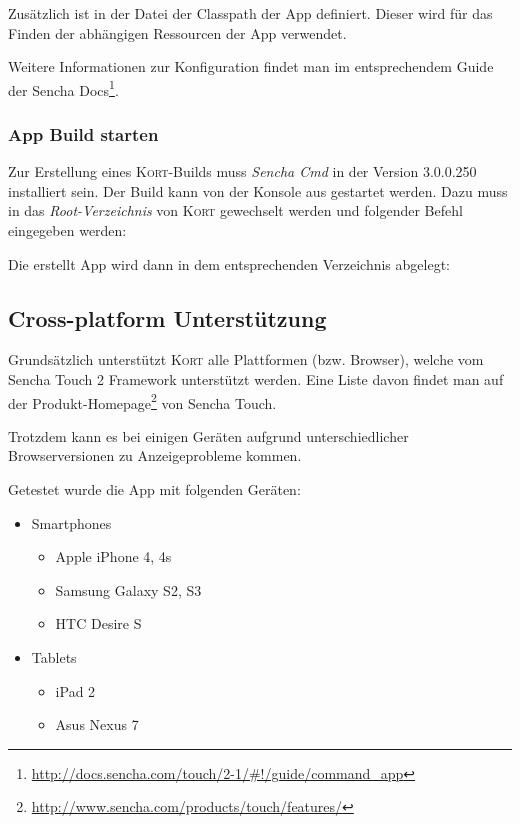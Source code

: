 Zusätzlich ist in der Datei  der Classpath der App definiert.
Dieser wird für das Finden der abhängigen Ressourcen der App verwendet.

Weitere Informationen zur Konfiguration findet man im entsprechendem Guide der Sencha Docs\footnote{\url{http://docs.sencha.com/touch/2-1/\#!/guide/command\_app}}.

\subsubsection{App Build starten}
Zur Erstellung eines \textsc{Kort}-Builds muss \emph{Sencha Cmd} in der Version 3.0.0.250 installiert sein.
Der Build kann von der Konsole aus gestartet werden. Dazu muss in das \emph{Root-Verzeichnis} von \textsc{Kort} gewechselt werden und folgender Befehl eingegeben werden:


Die erstellt App wird dann in dem entsprechenden Verzeichnis abgelegt:


\subsection{Cross-platform Unterstützung}
\label{cross-platform}
Grundsätzlich unterstützt \textsc{Kort} alle Plattformen (bzw. Browser), welche vom Sencha Touch 2 Framework unterstützt werden.
Eine Liste davon findet man auf der Produkt-Homepage\footnote{\url{http://www.sencha.com/products/touch/features/}} von Sencha Touch.

Trotzdem kann es bei einigen Geräten aufgrund unterschiedlicher Browserversionen zu Anzeigeprobleme kommen.

Getestet wurde die App mit folgenden Geräten:

\begin{itemize}
	\item Smartphones
	\begin{itemize}
		\item Apple iPhone 4, 4s
		\item Samsung Galaxy S2, S3
		\item HTC Desire S
	\end{itemize}
	\item Tablets
	\begin{itemize}
		\item iPad 2
		\item Asus Nexus 7
	\end{itemize}
\end{itemize}

